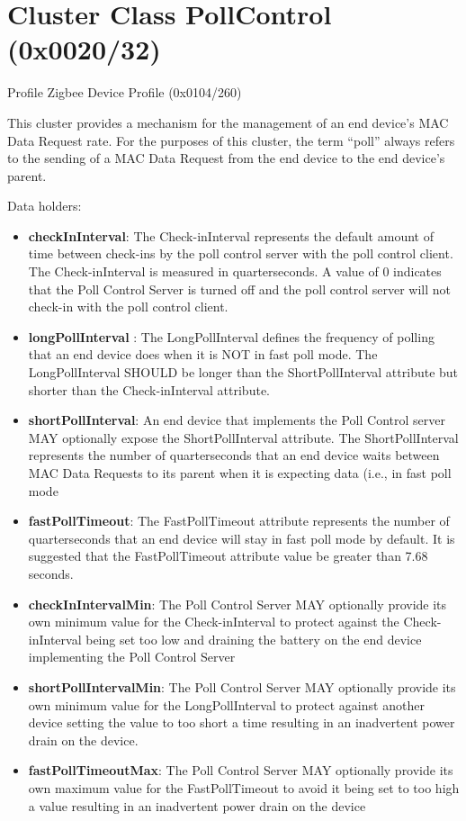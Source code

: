 \section{Cluster Class PollControl (0x0020/32)}

Profile Zigbee Device Profile (0x0104/260)

This cluster provides a mechanism for the management of an end device’s MAC Data Request rate. For the purposes of this cluster, the term “poll” always refers to the sending of a MAC Data Request from the end device to the end device’s parent.
\newline

\noindent
Data holders:

\begin{itemize}
\item \textbf{checkInInterval}: The Check-inInterval represents the default amount of time between check-ins by the poll control server with the poll control client. The Check-inInterval is measured in quarterseconds. A value of 0 indicates that the Poll Control Server is turned off and the poll control server will not check-in with the poll control client.
\item \textbf{longPollInterval    }: The LongPollInterval defines the frequency of polling that an end device does when it is NOT in fast poll mode. The LongPollInterval SHOULD be longer than the ShortPollInterval attribute but shorter than the Check-inInterval attribute.
\item \textbf{shortPollInterval}: An end device that implements the Poll Control server MAY optionally expose the ShortPollInterval attribute. The ShortPollInterval represents the number of quarterseconds that an end device waits between MAC Data Requests to its parent when it is expecting data (i.e., in fast poll mode
\item \textbf{fastPollTimeout}:     The FastPollTimeout attribute represents the number of quarterseconds that an end device will stay in fast poll mode by default. It is suggested that the FastPollTimeout attribute value be greater than 7.68 seconds.
\item \textbf{checkInIntervalMin}: The Poll Control Server MAY optionally provide its own minimum value for the Check-inInterval to protect against the Check-inInterval being set too low and draining the battery on the end device implementing the Poll Control Server
\item \textbf{shortPollIntervalMin}: The Poll Control Server MAY optionally provide its own minimum value for the LongPollInterval to protect against another device setting the value to too short a time resulting in an inadvertent power drain on the device.
\item \textbf{fastPollTimeoutMax}: The Poll Control Server MAY optionally provide its own maximum value for the FastPollTimeout to avoid it being set to too high a value resulting in an inadvertent power drain on the device
\end{itemize}


